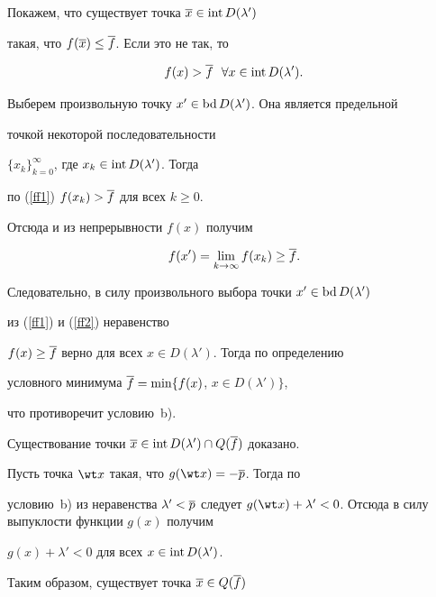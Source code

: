 \begin{pf}


Покажем, что существует точка $\overline x\in \operatorname{int} D(\lambda')$


такая, что $f(\overline x)\leq\overline f$. Если это не так, то


\begin{equation}\label{ff1}


f(x)>\o f \ \ \forall x\in \Int D(\lambda').


\end{equation}


Выберем произвольную точку $x'\in \operatorname{bd} D(\lambda')$. Она является предельной 


точкой некоторой последовательности


$\{x_k\}_{k=0}^\infty$, где $x_k\in \operatorname{int} D(\lambda')$. Тогда 


по (\ref{ff1}) $f(x_k)>\overline f$ для всех $k\geq 0$.


Отсюда и из непрерывности $f(x)$ получим


\begin{equation}\label{ff2}


f(x')=\lim\limits_{k\to\infty}f(x_k)\geq\o f.


\end{equation}


Следовательно, в силу произвольного выбора точки $x'\in \operatorname{bd} D(\lambda')$ 


из (\ref{ff1}) и (\ref{ff2}) неравенство


$f(x)\geq\overline f$ верно для всех $x\in D(\lambda')$. Тогда по определению 


условного минимума $\overline f=\min\{f(x)$, $x\in D(\lambda')\}$,


что противоречит условию~b).


Существование точки $\overline x\in \operatorname{int} D(\lambda')\cap Q(\overline f)$ доказано.





Пусть точка $\wt x$ такая, что $g(\wt x)=-\o p$. Тогда по


условию~b) из неравенства $\lambda'<\o p$ следует $g(\wt


x)+\lambda'<0$. Отсюда в силу выпуклости функции $g(x)$ получим


$g(x)+\lambda'<0$ для всех $x\in \operatorname{int} D(\lambda')$.





Таким образом, существует точка $\overline x\in Q(\overline f)$



\end{pf}
